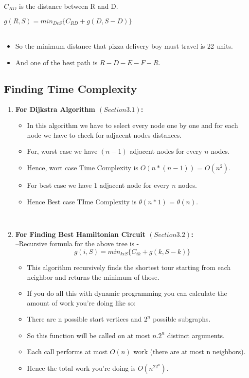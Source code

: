 \documentclass{article}
\begin{document}
    $C_{RD}$ is the distance between R and D.
    
    $g(R,S)=min_{D\epsilon S}\{C_{RD} + g(D,S-{D})\}$\\
    \\
    \begin{itemize}
        \item So the minimum distance that pizza delivery boy must travel is 22 units.
        \item And one of the best path is $R-D-E-F-R$.  \citep{key2}\\
    \end{itemize}
    
    \newpage
    \subsection{Finding Time Complexity}
    \begin{enumerate}
        \item \textbf{For Dijkstra Algorithm $(Section 3.1)$:}
        \begin{itemize}
            \item In this algorithm we have to select every node one by one and for each node we have to check for adjacent nodes distances.
            \item For, worst case we have $(n-1)$ adjacent nodes for every $n$ nodes.
            \item Hence, wort case Time Complexity is $O(n*(n-1))$ = $O(n^2)$.
            \item For best case we have $1$ adjacent node for every $n$ nodes.
            \item Hence Best case TIme Complexity is $\theta(n*1)$ = $\theta(n)$.
        \end{itemize} \\
        
        \item \textbf{For Finding Best Hamiltonian Circuit $(Section 3.2)$:}\\
        --Recursive formula for the above tree is - 
            $$g(i,S)=min_{k\epsilon S}\{C_{ik} + g(k,S-{k})\}$$
            \begin{itemize}
                \item This algorithm recursively finds the shortest tour starting from each neighbor and returns the minimum of those. 
                \item If you do all this with dynamic programming you can calculate the amount of work you're doing like so:
                \item There are n possible start vertices and $2^n$ possible subgraphs. 
                \item So this function will be called on at most $n.2^n$ distinct arguments.
                \item Each call performs at most $O(n)$ work (there are at most n neighbors). 
                \item Hence the total work you're doing is $O(n^22^n)$.  \citep{key3}
            \end{itemize}
            
    \end{enumerate}
\end{document}

